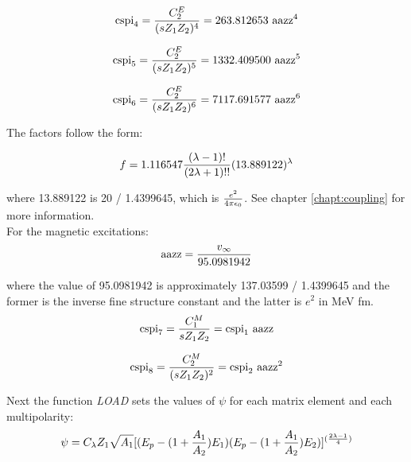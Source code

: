 \begin{equation}
\mathrm{cspi}_4 = {C_2^E \over (s Z_1 Z_2)^4} = 263.812653 ~\mathrm{aazz}^4
\end{equation}

\begin{equation}
\mathrm{cspi}_5 = {C_2^E \over (s Z_1 Z_2)^5} = 1332.409500 ~\mathrm{aazz}^5
\end{equation}

\begin{equation}
\mathrm{cspi}_6 = {C_2^E \over (s Z_1 Z_2)^6} = 7117.691577 ~\mathrm{aazz}^6
\end{equation}

\noindent The factors follow the form:

\begin{equation}
f = 1.116547 {(\lambda - 1)! \over (2 \lambda + 1)!!} (13.889122)^{\lambda}
\end{equation}

\noindent where 13.889122 is 20 / 1.4399645, which is ${e^2 \over 4 \pi
\epsilon_0}$. See chapter \ref{chapt:coupling} for more information.\\

\noindent For the magnetic excitations:\\

\begin{equation}
\mathrm{aazz} = {v_\infty \over 95.0981942}
\end{equation}

\noindent where the value of 95.0981942 is approximately 137.03599 /
1.4399645 and the former is the inverse fine structure constant and the
latter is $e^2$ in MeV fm.\\

\begin{equation}
\mathrm{cspi}_7 = {C_1^M \over s Z_1 Z_2} = \mathrm{cspi}_1 ~\mathrm{aazz}
\end{equation}

\begin{equation}
\mathrm{cspi}_8 = {C_2^M \over (s Z_1 Z_2)^2} = \mathrm{cspi}_2 ~\mathrm{aazz}^2
\end{equation}

\noindent Next the function {\em LOAD} sets the values of $\psi$ for each
matrix element and each multipolarity:\\

\begin{equation}
\psi = C_\lambda Z_1 \sqrt{A_1} \large[(E_p - (1 + {A_1 \over A_2}) E_1)
(E_p - (1 + {A_1 \over A_2}) E_2)\large]^{({2 \lambda - 1 \over 4})}
\end{equation}

